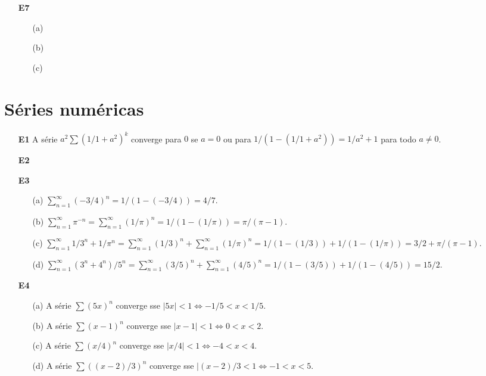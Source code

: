 \documentclass{article}
\begin{document}
\begin{enumerate}
\begin{enumerate}
        \end{enumerate}
    \item [\textbf{E7}]
        \begin{enumerate}
            \item [(a)] 
            \item [(b)]
            \item [(c)]
        \end{enumerate}
\end{enumerate}

\section*{Séries numéricas}

\begin{enumerate}
    \item [\textbf{E1}] A série \(a^2\sum (1/1+a^2)^k\) converge para \(0\) se \(a=0\) ou para \(1/(1-(1/1+a^2)) = 1/a^2 + 1\) para todo \(a \neq 0\).
    \item [\textbf{E2}]
    \item [\textbf{E3}]
        \begin{enumerate}
            \item [(a)] \(\sum_{n=1}^{\infty} \left(-3/4\right)^n = 1/(1-(-3/4)) = 4/7\).
            \item [(b)] \(\sum_{n=1}^{\infty} \pi^{-n} = \sum_{n=1}^{\infty} (1/\pi)^n = 1/(1-(1/\pi)) = \pi/(\pi-1)\).
            \item [(c)] \(\sum_{n=1}^{\infty} 1/3^n + 1/\pi^n = \sum_{n=1}^{\infty} (1/3)^n + \sum_{n=1}^{\infty} (1/\pi)^n = 1/(1-(1/3)) + 1/(1-(1/\pi)) = 3/2 + \pi/(\pi-1)\). 
            \item [(d)] \(\sum_{n=1}^{\infty} (3^n + 4^n)/5^n = \sum_{n=1}^{\infty} (3/5)^n + \sum_{n=1}^{\infty} (4/5)^n = 1/(1-(3/5)) + 1/(1-(4/5)) = 15/2\).
        \end{enumerate}
    \item [\textbf{E4}]
        \begin{enumerate}
            \item [(a)] A série \(\sum (5x)^n\) converge sse \(|5x| < 1 \iff -1/5<x<1/5\).
            \item [(b)] A série \(\sum (x-1)^n\) converge sse \(|x-1| < 1 \iff 0<x<2\).
            \item [(c)] A série \(\sum (x/4)^n\) converge sse \(|x/4| < 1 \iff -4<x<4\).
            \item [(d)] A série \(\sum ((x-2)/3)^n\) converge sse \(|(x-2)/3 < 1 \iff -1<x<5\).

\end{enumerate}
\end{enumerate}
\end{document}
